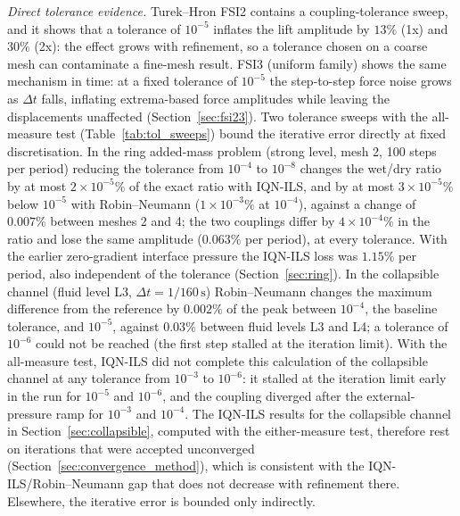 \emph{Direct tolerance evidence.}
Turek--Hron FSI2 contains a coupling-tolerance sweep, and it shows that a tolerance of $10^{-5}$ inflates the lift amplitude by $13\%$ (1x) and $30\%$ (2x): the effect grows with refinement, so a tolerance chosen on a coarse mesh can contaminate a fine-mesh result.
FSI3 (uniform family) shows the same mechanism in time: at a fixed tolerance of $10^{-5}$ the step-to-step force noise grows as $\Delta t$ falls, inflating extrema-based force amplitudes while leaving the displacements unaffected (Section~\ref{sec:fsi23}).
Two tolerance sweeps with the all-measure test (Table~\ref{tab:tol_sweeps}) bound the iterative error directly at fixed discretisation.
In the ring added-mass problem (strong level, mesh 2, 100 steps per period) reducing the tolerance from $10^{-4}$ to $10^{-8}$ changes the wet/dry ratio by at most $2\times10^{-5}\%$ of the exact ratio with IQN-ILS, and by at most $3\times10^{-5}\%$ below $10^{-5}$ with Robin--Neumann ($1\times10^{-3}\%$ at $10^{-4}$), against a change of $0.007\%$ between meshes 2 and 4; the two couplings differ by $4\times10^{-4}\%$ in the ratio and lose the same amplitude ($0.063\%$ per period), at every tolerance. With the earlier zero-gradient interface pressure the IQN-ILS loss was $1.15\%$ per period, also independent of the tolerance (Section~\ref{sec:ring}).
In the collapsible channel (fluid level L3, $\Delta t = 1/160\,\mathrm{s}$) Robin--Neumann changes the maximum difference from the reference by $0.002\%$ of the peak between $10^{-4}$, the baseline tolerance, and $10^{-5}$, against $0.03\%$ between fluid levels L3 and L4; a tolerance of $10^{-6}$ could not be reached (the first step stalled at the iteration limit).
With the all-measure test, IQN-ILS did not complete this calculation of the collapsible channel at any tolerance from $10^{-3}$ to $10^{-6}$: it stalled at the iteration limit early in the run for $10^{-5}$ and $10^{-6}$, and the coupling diverged after the external-pressure ramp for $10^{-3}$ and $10^{-4}$.
The IQN-ILS results for the collapsible channel in Section~\ref{sec:collapsible}, computed with the either-measure test, therefore rest on iterations that were accepted unconverged (Section~\ref{sec:convergence_method}), which is consistent with the IQN-ILS/Robin--Neumann gap that does not decrease with refinement there.
Elsewhere, the iterative error is bounded only indirectly.


